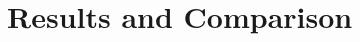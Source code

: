 \documentclass[../main.tex]{subfiles}
\begin{document}
\section{Results and Comparison}
\label{sec:results_and_comparison}
\end{document}
